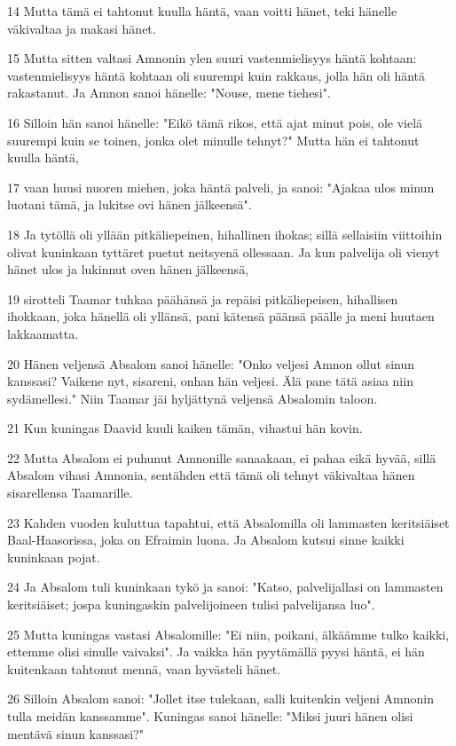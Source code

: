 \par 14 Mutta tämä ei tahtonut kuulla häntä, vaan voitti hänet, teki hänelle väkivaltaa ja makasi hänet.
\par 15 Mutta sitten valtasi Amnonin ylen suuri vastenmielisyys häntä kohtaan: vastenmielisyys häntä kohtaan oli suurempi kuin rakkaus, jolla hän oli häntä rakastanut. Ja Amnon sanoi hänelle: "Nouse, mene tiehesi".
\par 16 Silloin hän sanoi hänelle: "Eikö tämä rikos, että ajat minut pois, ole vielä suurempi kuin se toinen, jonka olet minulle tehnyt?" Mutta hän ei tahtonut kuulla häntä,
\par 17 vaan huusi nuoren miehen, joka häntä palveli, ja sanoi: "Ajakaa ulos minun luotani tämä, ja lukitse ovi hänen jälkeensä".
\par 18 Ja tytöllä oli yllään pitkäliepeinen, hihallinen ihokas; sillä sellaisiin viittoihin olivat kuninkaan tyttäret puetut neitsyenä ollessaan. Ja kun palvelija oli vienyt hänet ulos ja lukinnut oven hänen jälkeensä,
\par 19 sirotteli Taamar tuhkaa päähänsä ja repäisi pitkäliepeisen, hihallisen ihokkaan, joka hänellä oli yllänsä, pani kätensä päänsä päälle ja meni huutaen lakkaamatta.
\par 20 Hänen veljensä Absalom sanoi hänelle: "Onko veljesi Amnon ollut sinun kanssasi? Vaikene nyt, sisareni, onhan hän veljesi. Älä pane tätä asiaa niin sydämellesi." Niin Taamar jäi hyljättynä veljensä Absalomin taloon.
\par 21 Kun kuningas Daavid kuuli kaiken tämän, vihastui hän kovin.
\par 22 Mutta Absalom ei puhunut Amnonille sanaakaan, ei pahaa eikä hyvää, sillä Absalom vihasi Amnonia, sentähden että tämä oli tehnyt väkivaltaa hänen sisarellensa Taamarille.
\par 23 Kahden vuoden kuluttua tapahtui, että Absalomilla oli lammasten keritsiäiset Baal-Haasorissa, joka on Efraimin luona. Ja Absalom kutsui sinne kaikki kuninkaan pojat.
\par 24 Ja Absalom tuli kuninkaan tykö ja sanoi: "Katso, palvelijallasi on lammasten keritsiäiset; jospa kuningaskin palvelijoineen tulisi palvelijansa luo".
\par 25 Mutta kuningas vastasi Absalomille: "Ei niin, poikani, älkäämme tulko kaikki, ettemme olisi sinulle vaivaksi". Ja vaikka hän pyytämällä pyysi häntä, ei hän kuitenkaan tahtonut mennä, vaan hyvästeli hänet.
\par 26 Silloin Absalom sanoi: "Jollet itse tulekaan, salli kuitenkin veljeni Amnonin tulla meidän kanssamme". Kuningas sanoi hänelle: "Miksi juuri hänen olisi mentävä sinun kanssasi?"
